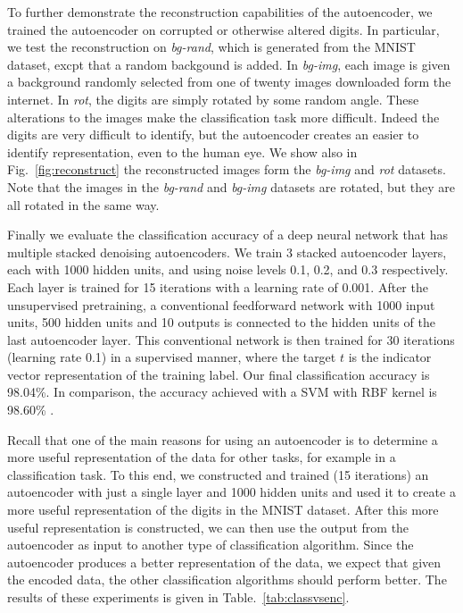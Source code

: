 To further demonstrate the reconstruction capabilities of the autoencoder, we 
trained the autoencoder on corrupted or otherwise altered digits.
In particular, we test the reconstruction
on \textit{bg-rand}, which is generated from the MNIST dataset, excpt that
a random backgound is added. In \textit{bg-img}, each image is given a background
randomly selected from one of twenty images downloaded form the internet. In 
\textit{rot}, the digits are simply rotated by some random angle.
These alterations to the images make the classification task more difficult. Indeed the
digits are very difficult to identify, but the autoencoder creates an easier to identify 
representation, even to the human eye. We show also in Fig.~\ref{fig:reconstruct} 
the reconstructed images form the \textit{bg-img} and \textit{rot} datasets. Note that
the images in the \textit{bg-rand} and \textit{bg-img} datasets are rotated, but they
are all rotated in the same way.



Finally we evaluate the classification accuracy of a deep neural network that
has multiple stacked denoising autoencoders. We train 3 stacked autoencoder
layers, each with 1000 hidden units, and using noise levels 0.1, 0.2, and 0.3
respectively. Each layer is trained for 15 iterations with a learning rate of
0.001. After the unsupervised pretraining, a conventional feedforward network
with 1000 input units, 500 hidden units and 10 outputs is connected to the
hidden units of the last autoencoder layer. This conventional network is then
trained for 30 iterations (learning rate 0.1) in a supervised manner, where the
target $t$ is the indicator vector representation of the training label. Our
final classification accuracy is 98.04\%. In comparison, the accuracy achieved
with a SVM with RBF kernel is 98.60\% \cite{vincent2010stacked}. 


Recall that one of the main reasons for using an autoencoder is to determine a
more useful representation of the data for other tasks, for example in a
classification task. To this end, we constructed and trained (15 iterations) an
autoencoder with just a single layer and 1000 hidden units and used it to
create a more useful representation of the digits in the MNIST dataset. After
this more useful representation is constructed, we can then use the output from
the autoencoder as input to another type of classification algorithm.  Since
the autoencoder produces a better representation of the data, we expect that
given the encoded data, the other classification algorithms should perform
better.  The results of these experiments is given in
Table.~\ref{tab:classvsenc}.


